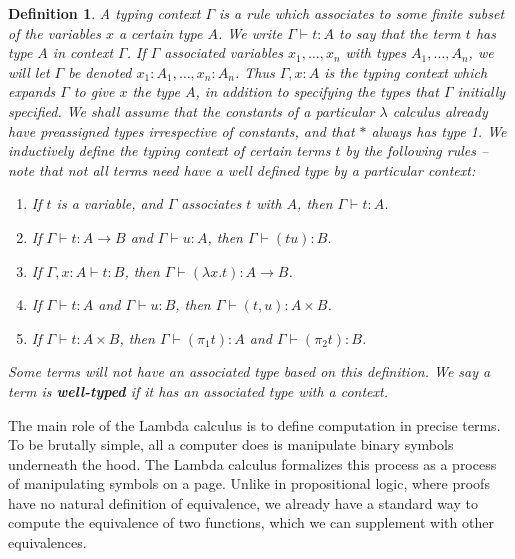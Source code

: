 \documentclass{article}
\theoremstyle{plain}
\newtheorem{definition}{Definition}
\begin{document}
\begin{definition}
    A typing context $\Gamma$ is a rule which associates to some finite subset of the variables $x$ a certain type $A$. We write $\Gamma \vdash t : A$ to say that the term $t$ has type $A$ in context $\Gamma$. If $\Gamma$ associated variables $x_1, \dots, x_n$ with types $A_1, \dots, A_n$, we will let $\Gamma$ be denoted $x_1:A_1, \dots, x_n:A_n$. Thus $\Gamma, x:A$ is the typing context which expands $\Gamma$ to give $x$ the type $A$, in addition to specifying the types that $\Gamma$ initially specified. We shall assume that the constants of a particular $\lambda$ calculus already have preassigned types irrespective of constants, and that $*$ always has type 1. We inductively define the typing context of certain terms $t$ by the following rules -- note that not all terms need have a well defined type by a particular context:
    \begin{enumerate}
        \item If $t$ is a variable, and $\Gamma$ associates $t$ with $A$, then $\Gamma \vdash t : A$.
        \item If $\Gamma \vdash t : A \rightarrow B$ and $\Gamma \vdash u : A$, then $\Gamma \vdash (tu) : B$.
        \item If $\Gamma, x : A \vdash t : B$, then $\Gamma \vdash (\lambda x.t) : A \to B$.
        \item If $\Gamma \vdash t: A$ and $\Gamma \vdash u : B$, then $\Gamma \vdash (t,u): A \times B$.
        \item If $\Gamma \vdash t: A \times B$, then $\Gamma \vdash (\pi_1 t) : A$ and $\Gamma \vdash (\pi_2 t) : B$.
    \end{enumerate}
    Some terms will not have an associated type based on this definition. We say a term is {\bf well-typed} if it has an associated type with a context.
\end{definition}

The main role of the Lambda calculus is to define computation in precise terms. To be brutally simple, all a computer does is manipulate binary symbols underneath the hood. The Lambda calculus formalizes this process as a process of manipulating symbols on a page. Unlike in propositional logic, where proofs have no natural definition of equivalence, we already have a standard way to compute the equivalence of two functions, which we can supplement with other equivalences.
\end{document}
